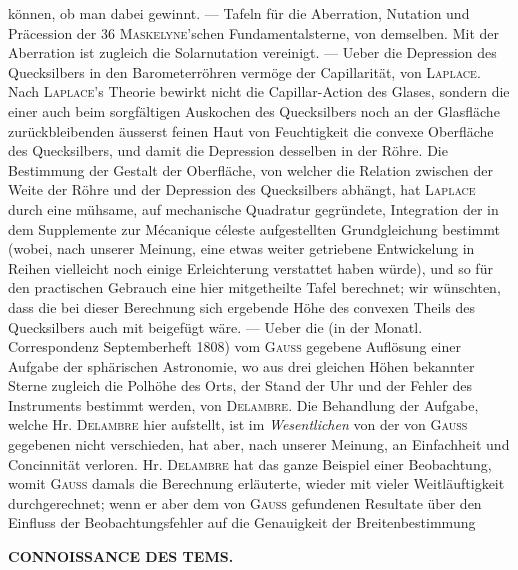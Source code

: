 können, ob man dabei gewinnt. --- Tafeln für die Aberration, Nutation und Präcession der 36 \textsc{Maskelyne}'schen Fundamentalsterne, von demselben. Mit der Aberration ist zugleich die Solarnutation vereinigt. --- Ueber die Depression des Quecksilbers in den Barometerröhren vermöge der Capillarität, von \textsc{Laplace}. Nach \textsc{Laplace}'s Theorie bewirkt nicht die Capillar-Action des Glases, sondern die einer auch beim sorgfältigen Auskochen des Quecksilbers noch an der Glasfläche zurückbleibenden äusserst feinen Haut von Feuchtigkeit die convexe Oberfläche des Quecksilbers, und damit die Depression desselben in der Röhre. Die Bestimmung der Gestalt der Oberfläche, von welcher die Relation zwischen der Weite der Röhre und der Depression des Quecksilbers abhängt, hat \textsc{Laplace} durch eine mühsame, auf mechanische Quadratur gegründete, Integration der in dem Supplemente zur Mécanique céleste aufgestellten Grundgleichung bestimmt (wobei, nach unserer Meinung, eine etwas weiter getriebene Entwickelung in Reihen vielleicht noch einige Erleichterung verstattet haben würde), und so für den practischen Gebrauch eine hier mitgetheilte Tafel berechnet; wir wünschten, dass die bei dieser Berechnung sich ergebende Höhe des convexen Theils des Quecksilbers auch mit beigefügt wäre. --- Ueber die (in der Monatl. Correspondenz Septemberheft 1808) vom \textsc{Gauss} gegebene Auflösung einer Aufgabe der sphärischen Astronomie, wo aus drei gleichen Höhen bekannter Sterne zugleich die Polhöhe des Orts, der Stand der Uhr und der Fehler des Instruments bestimmt werden, von \textsc{Delambre}. Die Behandlung der Aufgabe, welche Hr. \textsc{Delambre} hier aufstellt, ist im \emph{Wesentlichen} von der von \textsc{Gauss} gegebenen nicht verschieden, hat aber, nach unserer Meinung, an Einfachheit und Concinnität verloren. Hr. \textsc{Delambre} hat das ganze Beispiel einer Beobachtung, womit \textsc{Gauss} damals die Berechnung erläuterte, wieder mit vieler Weitläuftigkeit durchgerechnet; wenn er aber dem von \textsc{Gauss} gefundenen Resultate über den Einfluss der Beobachtungsfehler auf die Genauigkeit der Breitenbestimmung\par
\clearpage
\noindent{}%
\makebox[12mm][l]{}%
\parbox[t]{\dimexpr\linewidth-24mm\relax}{\centering\footnotesize\bfseries CONNOISSANCE DES TEMS.\par}%
\par\nobreak\medskip
